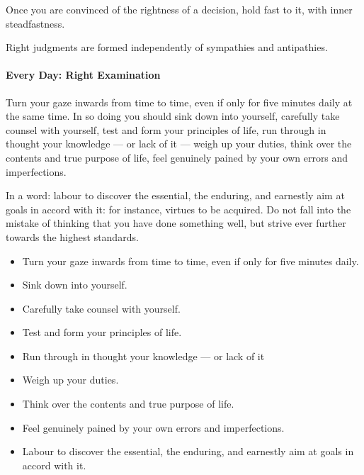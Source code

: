 Once you are convinced of the rightness of a decision, hold fast to it, with inner steadfastness.

Right judgments are formed independently of sympathies and antipathies.

\paragraph{Every Day: Right Examination}
Turn your gaze inwards from time to time, even if only for five minutes daily at the same time. In so doing you should sink down into yourself, carefully take counsel with yourself, test and form your principles of life, run through in thought your knowledge — or lack of it — weigh up your duties, think over the contents and true purpose of life, feel genuinely pained by your own errors and imperfections.

In a word: labour to discover the essential, the enduring, and earnestly aim at goals in accord with it: for instance, virtues to be acquired. Do not fall into the mistake of thinking that you have done something well, but strive ever further towards the highest standards.

\begin{itemize}
\item Turn your gaze inwards from time to time, even if only for five minutes daily. 
\item Sink down into yourself. 
\item Carefully take counsel with yourself. 
\item Test and form your principles of life. 
\item Run through in thought your knowledge — or lack of it 
\item Weigh up your duties. 
\item Think over the contents and true purpose of life. 
\item Feel genuinely pained by your own errors and imperfections. 
\item Labour to discover the essential, the enduring, and earnestly aim at goals in accord with it. 
\end{itemize}


